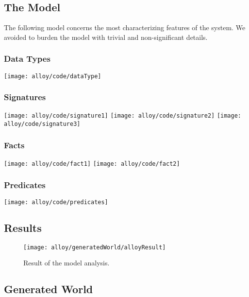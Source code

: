 \subsection{The Model}
	The following model concerns the most characterizing features of the system. We avoided to burden the model with trivial and non-significant details.
	
	\subsubsection*{Data Types}
		\texttt{[image: alloy/code/dataType]}

	\subsubsection*{Signatures}
		\texttt{[image: alloy/code/signature1]}
		\vfill
		\texttt{[image: alloy/code/signature2]}
		\vfill
		\texttt{[image: alloy/code/signature3]}
		\bigskip
	
	\subsubsection*{Facts}
		\texttt{[image: alloy/code/fact1]}
		\vfill
		\texttt{[image: alloy/code/fact2]}
		\bigskip
	
	\subsubsection*{Predicates}
		\texttt{[image: alloy/code/predicates]}
		\bigskip
		
		
\subsection{Results}
	\begin{figure}[H]
		\centering
		\texttt{[image: alloy/generatedWorld/alloyResult]}
		\caption{Result of the model analysis.}		
		\label{fig:alloyResult}
	\end{figure}
	\bigskip
	
	
\subsection{Generated World}


